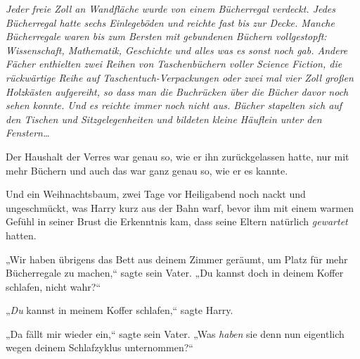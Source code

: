 \emph{Jeder freie Zoll an Wandfläche wurde von einem Bücherregal verdeckt. Jedes Bücherregal hatte sechs Einlegeböden und reichte fast bis zur Decke. Manche Bücherregale waren bis zum Bersten mit gebundenen Büchern vollgestopft: Wissenschaft, Mathematik, Geschichte und alles was es sonst noch gab. Andere Fächer enthielten zwei Reihen von Taschenbüchern voller Science Fiction, die rückwärtige Reihe auf Taschentuch-Verpackungen oder zwei mal vier Zoll großen Holzkästen aufgereiht, so dass man die Buchrücken über die Bücher davor noch sehen konnte. Und es reichte immer noch nicht aus. Bücher stapelten sich auf den Tischen und Sitzgelegenheiten und bildeten kleine Häuflein unter den Fenstern…}

Der Haushalt der Verres war genau so, wie er ihn zurückgelassen hatte, nur mit mehr Büchern und auch das war ganz genau so, wie er es kannte.

Und ein Weihnachtsbaum, zwei Tage vor Heiligabend noch nackt und ungeschmückt, was Harry kurz aus der Bahn warf, bevor ihm mit einem warmen Gefühl in seiner Brust die Erkenntnis kam, dass seine Eltern natürlich \emph{gewartet} hatten.

„Wir haben übrigens das Bett aus deinem Zimmer geräumt, um Platz für mehr Bücherregale zu machen,“ sagte sein Vater. „Du kannst doch in deinem Koffer schlafen, nicht wahr?“

„\emph{Du} kannst in meinem Koffer schlafen,“ sagte Harry.

„Da fällt mir wieder ein,“ sagte sein Vater. „Was \emph{haben} sie denn nun eigentlich wegen deinem Schlafzyklus unternommen?“

